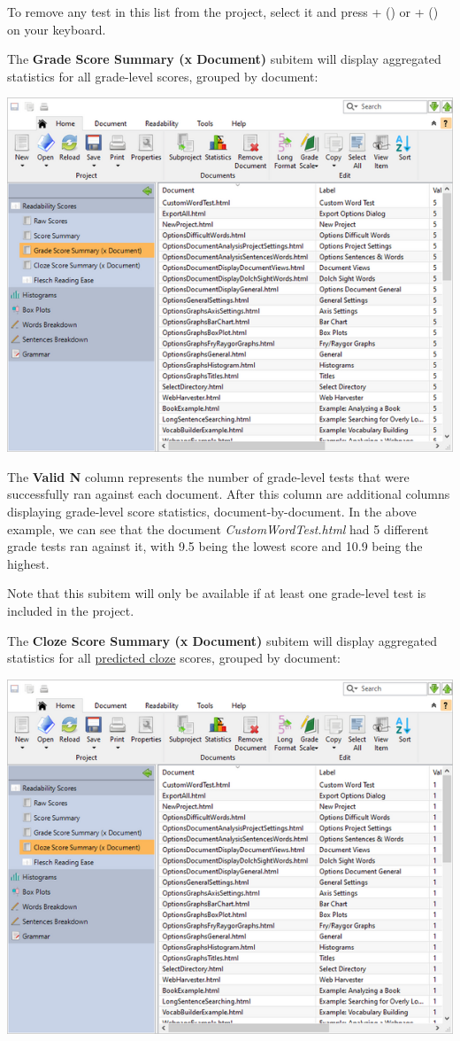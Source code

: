 \documentclass[
]{book}
\theoremstyle{definition}
\theoremstyle{definition}
\theoremstyle{definition}
\theoremstyle{definition}
\theoremstyle{remark}
\begin{document}
To remove any test in this list from the project, select it and press + (\faWindows) or \keys{\cmd}+\keys{\backdel} (\faApple) on your keyboard.

The \textbf{Grade Score Summary (x Document)} subitem will display aggregated statistics for all grade-level scores, grouped by document:

\includegraphics{Images/BatchGradeScoresByDocument.png}

The \textbf{Valid N} column represents the number of grade-level tests that were successfully ran against each document. After this column are additional columns displaying grade-level score statistics, document-by-document. In the above example, we can see that the document \emph{CustomWordTest.html} had 5 different grade tests ran against it, with 9.5 being the lowest score and 10.9 being the highest.

Note that this subitem will only be available if at least one grade-level test is included in the project.

The \textbf{Cloze Score Summary (x Document)} subitem will display aggregated statistics for all \protect\hyperlink{cloze}{predicted cloze} scores, grouped by document:

\includegraphics{Images/BatchClozeScoresByDocument.png}
\end{document}
